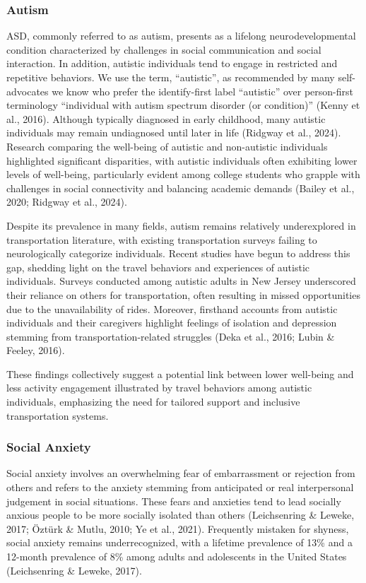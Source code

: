 \documentclass[
  letterpaper,
  number,
  review,
  3p]{elsarticle}
\begin{document}
\subsubsection{Autism}\label{autism}

ASD, commonly referred to as autism, presents as a lifelong
neurodevelopmental condition characterized by challenges in social
communication and social interaction. In addition, autistic individuals
tend to engage in restricted and repetitive behaviors. We use the term,
``autistic'', as recommended by many self-advocates we know who prefer
the identify-first label ``autistic'' over person-first terminology
``individual with autism spectrum disorder (or condition)'' (Kenny et
al., 2016). Although typically diagnosed in early childhood, many
autistic individuals may remain undiagnosed until later in life (Ridgway
et al., 2024). Research comparing the well-being of autistic and
non-autistic individuals highlighted significant disparities, with
autistic individuals often exhibiting lower levels of well-being,
particularly evident among college students who grapple with challenges
in social connectivity and balancing academic demands (Bailey et al.,
2020; Ridgway et al., 2024).

Despite its prevalence in many fields, autism remains relatively
underexplored in transportation literature, with existing transportation
surveys failing to neurologically categorize individuals. Recent studies
have begun to address this gap, shedding light on the travel behaviors
and experiences of autistic individuals. Surveys conducted among
autistic adults in New Jersey underscored their reliance on others for
transportation, often resulting in missed opportunities due to the
unavailability of rides. Moreover, firsthand accounts from autistic
individuals and their caregivers highlight feelings of isolation and
depression stemming from transportation-related struggles (Deka et al.,
2016; Lubin \& Feeley, 2016).

These findings collectively suggest a potential link between lower
well-being and less activity engagement illustrated by travel behaviors
among autistic individuals, emphasizing the need for tailored support
and inclusive transportation systems.

\subsubsection{Social Anxiety}\label{social-anxiety}

Social anxiety involves an overwhelming fear of embarrassment or
rejection from others and refers to the anxiety stemming from
anticipated or real interpersonal judgement in social situations. These
fears and anxieties tend to lead socially anxious people to be more
socially isolated than others (Leichsenring \& Leweke, 2017; Öztürk \&
Mutlu, 2010; Ye et al., 2021). Frequently mistaken for shyness, social
anxiety remains underrecognized, with a lifetime prevalence of 13\% and
a 12-month prevalence of 8\% among adults and adolescents in the United
States (Leichsenring \& Leweke, 2017).
\end{document}
